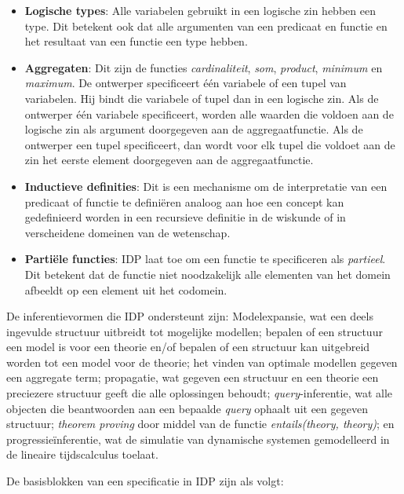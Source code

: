 \begin{itemize}
	\item \textbf{Logische types}: Alle variabelen gebruikt in een logische zin hebben een type. Dit betekent ook dat alle argumenten van een predicaat en functie en het resultaat van een functie een type hebben.
	\item \textbf{Aggregaten}: Dit zijn de functies \textit{cardinaliteit}, \textit{som}, \textit{product}, \textit{minimum} en \textit{maximum}. De ontwerper specificeert \'e\'en variabele of een tupel van variabelen. Hij bindt die variabele of tupel dan in een logische zin. Als de ontwerper \'e\'en variabele specificeert, worden alle waarden die voldoen aan de logische zin als argument doorgegeven aan de aggregaatfunctie. Als de ontwerper een tupel specificeert, dan wordt voor elk tupel die voldoet aan de zin het eerste element doorgegeven aan de aggregaatfunctie.
	\item \textbf{Inductieve definities}: Dit is een mechanisme om de interpretatie van een predicaat of functie te defini\"eren analoog aan hoe een concept kan gedefinieerd worden in een recursieve definitie in de wiskunde of in verscheidene domeinen van de wetenschap.
	\item \textbf{Parti\"ele functies}: IDP laat toe om een functie te specificeren als \textit{partieel}. Dit betekent dat de functie niet noodzakelijk alle elementen van het domein afbeeldt op een element uit het codomein.
\end{itemize}

De inferentievormen die IDP ondersteunt zijn: Modelexpansie, wat een deels ingevulde structuur uitbreidt tot mogelijke modellen; bepalen of een structuur een model is voor een theorie en/of bepalen of een structuur kan uitgebreid worden tot een model voor de theorie; het vinden van optimale modellen gegeven een aggregate term; propagatie, wat gegeven een structuur en een theorie een preciezere structuur geeft die alle oplossingen behoudt; \textit{query}-inferentie, wat alle objecten die beantwoorden aan een bepaalde \textit{query} ophaalt uit een gegeven structuur; \textit{theorem proving} door middel van de functie \textit{entails(theory, theory)}; en progressie\"inferentie, wat de simulatie van dynamische systemen gemodelleerd in de lineaire tijdscalculus\cite{BogaertsBart2014Sdsu} toelaat.

De basisblokken van een specificatie in IDP zijn als volgt:

